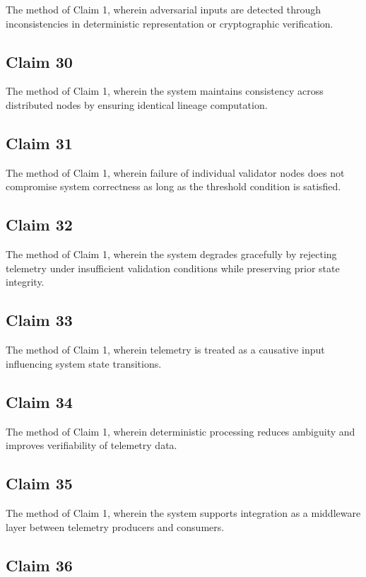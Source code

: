 The method of Claim 1, wherein adversarial inputs are detected through inconsistencies in deterministic representation or cryptographic verification.

\subsection{Claim 30}

The method of Claim 1, wherein the system maintains consistency across distributed nodes by ensuring identical lineage computation.

\subsection{Claim 31}

The method of Claim 1, wherein failure of individual validator nodes does not compromise system correctness as long as the threshold condition is satisfied.

\subsection{Claim 32}

The method of Claim 1, wherein the system degrades gracefully by rejecting telemetry under insufficient validation conditions while preserving prior state integrity.

\subsection{Claim 33}

The method of Claim 1, wherein telemetry is treated as a causative input influencing system state transitions.

\subsection{Claim 34}

The method of Claim 1, wherein deterministic processing reduces ambiguity and improves verifiability of telemetry data.

\subsection{Claim 35}

The method of Claim 1, wherein the system supports integration as a middleware layer between telemetry producers and consumers.

\subsection{Claim 36}

